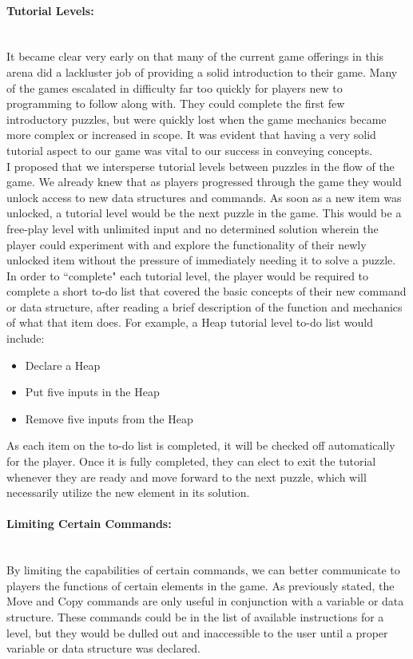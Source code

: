 \paragraph{Tutorial Levels:}\mbox{} \\
It became clear very early on that many of the current game offerings in this arena did a lackluster job of
providing a solid introduction to their game. Many of the games escalated in difficulty far too quickly for
players new to programming to follow along with. They could complete the first few introductory puzzles,
but were quickly lost when the game mechanics became more complex or increased in scope. It was evident
that having a very solid tutorial aspect to our game was vital to our success in conveying concepts.\\

I proposed that we intersperse tutorial levels between puzzles in the flow of the game. We already knew that
as players progressed through the game they would unlock access to new data structures and commands. As
soon as a new item was unlocked, a tutorial level would be the next puzzle in the game. This would be a free-play
level with unlimited input and no determined solution wherein the player could experiment with and explore
the functionality of their newly unlocked item without the pressure of immediately needing it to solve a puzzle.\\

In order to ``complete" each tutorial level, the player would be required to complete a short to-do list that
covered the basic concepts of their new command or data structure, after reading a brief description of the function
and mechanics of what that item does. For example, a Heap tutorial level to-do list would include:
\begin{itemize}
	\item Declare a Heap
	\item Put five inputs in the Heap
	\item Remove five inputs from the Heap
\end{itemize}
As each item on the to-do list is completed, it will be checked off automatically for the player. Once it is fully
completed, they can elect to exit the tutorial whenever they are ready and move forward to the next
puzzle, which will necessarily utilize the new element in its solution. \\

\paragraph{Limiting Certain Commands:}\mbox{} \\
By limiting the capabilities of certain commands, we can better communicate to players the functions of certain
elements in the game. As previously stated, the Move and Copy commands are only useful in conjunction with a
variable or data structure. These commands could be in the list of available instructions for a level, but they would be
dulled out and inaccessible to the user until a proper variable or data structure was declared.\\

